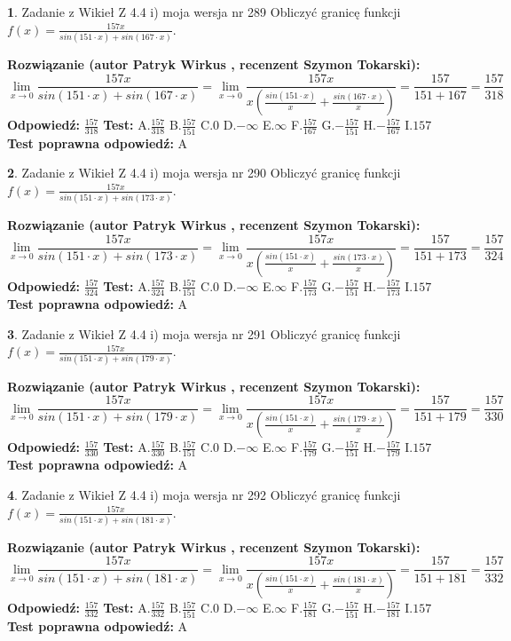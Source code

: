 \documentclass[12pt, a4paper]{article}
\theoremstyle{definition} %
\newtheorem{zad}{}
\newcommand{\zadStart}[1]{\begin{zad}#1\newline}
\newcommand{\zadStop}{\end{zad}}
\newcommand{\rozwStart}[2]{\noindent \textbf{Rozwiązanie (autor #1 , recenzent #2): }\newline}
\newcommand{\rozwStop}{\newline}
\newcommand{\odpStart}{\noindent \textbf{Odpowiedź:}\newline}
\newcommand{\odpStop}{\newline}
\newcommand{\testStart}{\noindent \textbf{Test:}\newline}
\newcommand{\testStop}{\newline}
\newcommand{\kluczStart}{\noindent \textbf{Test poprawna odpowiedź:}\newline}
\newcommand{\kluczStop}{\newline}
\begin{document}
\zadStart{Zadanie z Wikieł Z 4.4 i) moja wersja nr 289}
Obliczyć granicę funkcji $f(x)=\frac{157x}{sin(151\cdot x) +sin(167\cdot x)}$.
\zadStop
\rozwStart{Patryk Wirkus}{Szymon Tokarski}
$$\lim\limits_{x\to 0}\frac{157x}{sin(151\cdot x) +sin(167\cdot x)}=\lim\limits_{x\to 0}\frac{157x}{x(\frac{sin(151\cdot x)}{x}+\frac{sin(167\cdot x)}{x})}=\frac{157}{151+167} = \frac{157}{318}$$
\rozwStop
\odpStart
$\frac{157}{318}$
\odpStop
\testStart
A.$\frac{157}{318}$
B.$\frac{157}{151}$
C.$0$
D.$-\infty$
E.$\infty$
F.$\frac{157}{167}$
G.$-\frac{157}{151}$
H.$-\frac{157}{167}$
I.$157$
\testStop
\kluczStart
A
\kluczStop



\zadStart{Zadanie z Wikieł Z 4.4 i) moja wersja nr 290}
Obliczyć granicę funkcji $f(x)=\frac{157x}{sin(151\cdot x) +sin(173\cdot x)}$.
\zadStop
\rozwStart{Patryk Wirkus}{Szymon Tokarski}
$$\lim\limits_{x\to 0}\frac{157x}{sin(151\cdot x) +sin(173\cdot x)}=\lim\limits_{x\to 0}\frac{157x}{x(\frac{sin(151\cdot x)}{x}+\frac{sin(173\cdot x)}{x})}=\frac{157}{151+173} = \frac{157}{324}$$
\rozwStop
\odpStart
$\frac{157}{324}$
\odpStop
\testStart
A.$\frac{157}{324}$
B.$\frac{157}{151}$
C.$0$
D.$-\infty$
E.$\infty$
F.$\frac{157}{173}$
G.$-\frac{157}{151}$
H.$-\frac{157}{173}$
I.$157$
\testStop
\kluczStart
A
\kluczStop



\zadStart{Zadanie z Wikieł Z 4.4 i) moja wersja nr 291}
Obliczyć granicę funkcji $f(x)=\frac{157x}{sin(151\cdot x) +sin(179\cdot x)}$.
\zadStop
\rozwStart{Patryk Wirkus}{Szymon Tokarski}
$$\lim\limits_{x\to 0}\frac{157x}{sin(151\cdot x) +sin(179\cdot x)}=\lim\limits_{x\to 0}\frac{157x}{x(\frac{sin(151\cdot x)}{x}+\frac{sin(179\cdot x)}{x})}=\frac{157}{151+179} = \frac{157}{330}$$
\rozwStop
\odpStart
$\frac{157}{330}$
\odpStop
\testStart
A.$\frac{157}{330}$
B.$\frac{157}{151}$
C.$0$
D.$-\infty$
E.$\infty$
F.$\frac{157}{179}$
G.$-\frac{157}{151}$
H.$-\frac{157}{179}$
I.$157$
\testStop
\kluczStart
A
\kluczStop



\zadStart{Zadanie z Wikieł Z 4.4 i) moja wersja nr 292}
Obliczyć granicę funkcji $f(x)=\frac{157x}{sin(151\cdot x) +sin(181\cdot x)}$.
\zadStop
\rozwStart{Patryk Wirkus}{Szymon Tokarski}
$$\lim\limits_{x\to 0}\frac{157x}{sin(151\cdot x) +sin(181\cdot x)}=\lim\limits_{x\to 0}\frac{157x}{x(\frac{sin(151\cdot x)}{x}+\frac{sin(181\cdot x)}{x})}=\frac{157}{151+181} = \frac{157}{332}$$
\rozwStop
\odpStart
$\frac{157}{332}$
\odpStop
\testStart
A.$\frac{157}{332}$
B.$\frac{157}{151}$
C.$0$
D.$-\infty$
E.$\infty$
F.$\frac{157}{181}$
G.$-\frac{157}{151}$
H.$-\frac{157}{181}$
I.$157$
\testStop
\kluczStart
A
\kluczStop
\end{document}

